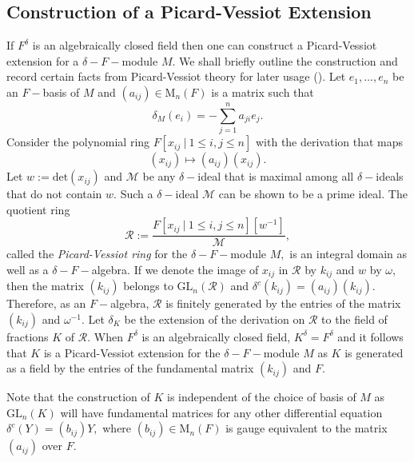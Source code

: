 \documentclass[preprint, 11pt]{amsart}
\theoremstyle{corollary}
\theoremstyle{remark}
\theoremstyle{proposition}
\numberwithin{equation}{subsection}
\begin{document}
\subsection{Construction of a Picard-Vessiot Extension} If  $F^{\delta}$ is an algebraically closed field then one can construct  a Picard-Vessiot extension for a $\delta-F-$module  $M.$ We shall briefly outline the construction and record certain facts from Picard-Vessiot theory for later usage   (\cite[Lemma 1.17 \& Proposition 1.20]{MvdP03}). Let $e_1, \dots, e_n$ be an $F-$basis of $M$ and $(a_{ij})\in \mathrm{M}_n(F)$ is  a matrix such that $$\delta_M(e_i)=-\sum^n_{j=1}a_{ji}e_j.$$  Consider the polynomial ring $F[x_{ij}\ |\ 1\leq i,j\leq n]$ with the derivation that maps $$(x_{ij})\mapsto (a_{ij})(x_{ij}).$$ Let $w:=\mathrm{det}(x_{ij})$ and $\mathscr M$ be any $\delta-$ideal that is maximal among all $\delta-$ideals that do not contain $w.$ Such a $\delta-$ideal $\mathscr M$ can be shown to be a prime ideal.  The  quotient ring $$\mathscr R:= \frac{F[x_{ij}\ |\ 1\leq i,j\leq n][w^{-1}]}{\mathscr M},$$   called the \emph{Picard-Vessiot ring} for the $\delta-F-$module $M,$ is an integral domain as well as a $\delta-F-$algebra. If we denote the image of $x_{ij}$ in $\mathscr R$ by $k_{ij}$ and $w$ by $\omega$, then the matrix $(k_{ij})$ belongs to $\mathrm{GL}_n(\mathscr R)$ and $\delta^c(k_{ij})=(a_{ij})(k_{ij}).$ Therefore, as an $F-$algebra, $\mathscr R$ is finitely generated by the entries of the matrix $(k_{ij})$ and $\omega^{-1}.$  Let $\delta_K$ be the extension of the derivation on $\mathscr R$ to the field of fractions $K$ of $\mathscr R.$  When $F^{\delta}$ is an algebraically closed field, $K^{\delta}=F^{\delta}$ and it follows that $K$  is a Picard-Vessiot extension for the $\delta-F-$module $M$ as $K$ is generated as a field by the entries of the fundamental matrix $(k_{ij})$ and $F.$ 

Note that the construction of $K$ is independent of the  choice of basis of $M$ as $\mathrm{GL}_n(K)$ will have fundamental matrices for any other differential equation $\delta^c(Y)=(b_{ij}) Y,$  where $(b_{ij})\in \mathrm{M}_n(F)$  is gauge equivalent  to the matrix $(a_{ij})$ over $F.$  
\end{document}
